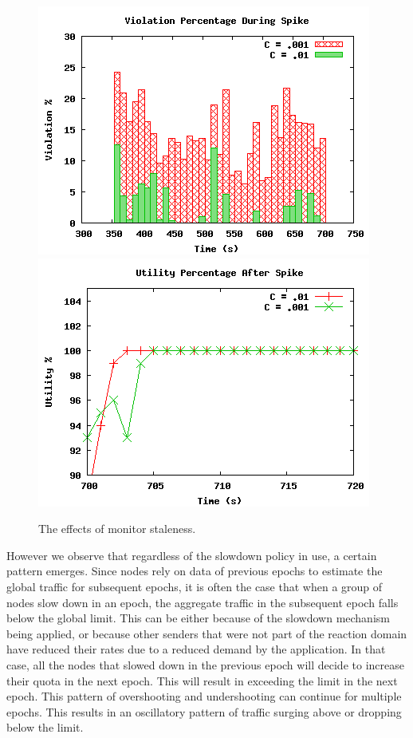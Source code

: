\begin{figure}[t]
 \centering
 \includegraphics[scale=1]{figures/evaluation/staleness/excess-during.eps}
 \includegraphics[scale=1]{figures/evaluation/staleness/utility-after.eps}
 \caption{The effects of monitor staleness.}
 \label{fig:monitor-staleness}
\end{figure}

However we observe that regardless of the slowdown policy in use, a certain pattern emerges. Since nodes rely on data of previous epochs to estimate the global traffic for subsequent epochs, it is often the case that when a group of nodes slow down in an epoch, the aggregate traffic in the subsequent epoch falls below the global limit. This can be either because of the slowdown mechanism being applied, or because other senders that were not part of the reaction domain have reduced their rates due to a reduced demand by the application. In that case, all the nodes that slowed down in the previous epoch will decide to increase their quota in the next epoch. This will result in exceeding the limit in the next epoch. This pattern of overshooting and undershooting can continue for multiple epochs. This results in an oscillatory pattern of traffic surging above or dropping below the limit.


